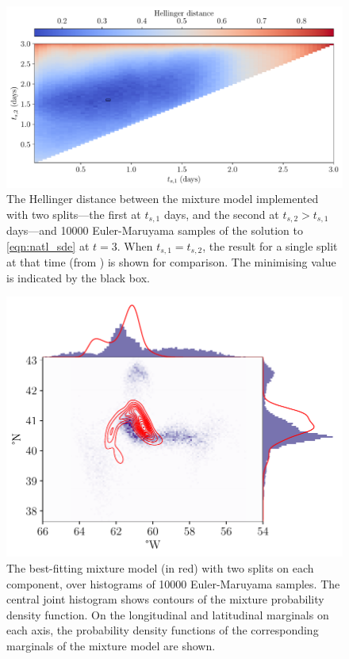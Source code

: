 \begin{figure}
	\centering
	\includegraphics[width=\textwidth]{chp06_applications/figures/gulf_stream/hell_dist_2split}
	\caption{The Hellinger distance between the mixture model implemented with two splits---the first at \(t_{s,1}\) days, and the second at \(t_{s,2} > t_{s,1}\) days---and 10000 Euler-Maruyama samples of the solution to \cref{eqn:natl_sde} at \(t = 3\).
		When \(t_{s,1} = t_{s,2}\), the result for a single split at that time (from ) is shown for comparison.
		The minimising value is indicated by the black box.}
	\label{fig:na_2split_hell}
\end{figure}

\begin{figure}
	\centering
	\includegraphics[width=\textwidth]{chp06_applications/figures/gulf_stream/gmm_2split_best}
	\caption{The best-fitting mixture model (in red) with two splits on each component, over histograms of 10000 Euler-Maruyama samples.
		The central joint histogram shows contours of the mixture probability density function.
		On the longitudinal and latitudinal marginals on each axis, the probability density functions of the corresponding marginals of the mixture model are shown.}
	\label{fig:na_2split_best}
\end{figure}

